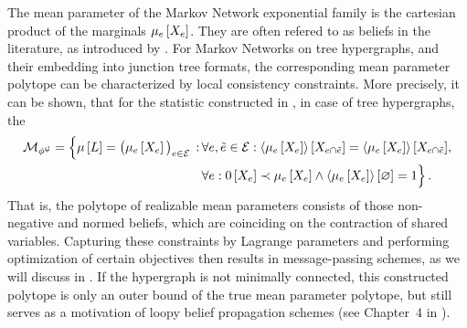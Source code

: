 The mean parameter of the Markov Network exponential family is the cartesian product of the marginals $\mu_{e}\left[X_{e}\right]$.
They are often refered to as beliefs in the literature, as introduced by \cite{pearl_probabilistic_1988}.
For Markov Networks on tree hypergraphs, and their embedding into junction tree formats, the corresponding mean parameter polytope can be characterized by local consistency constraints.
More precisely, it can be shown, that for the statistic constructed in , in case of tree hypergraphs, the
\begin{align*}
    \mathcal{M}_{\phi^{\mathcal{G}}}
    = \Big\{ \mu\left[L\right]=\big(\mu_{e}\left[X_{e}\right]\big)_{e\in\mathcal{E}} \, : \,
    & \forall{e,\tilde{e}\in\mathcal{E}}:{
        \left\langle \mu_{e}\left[X_{e}\right]\right\rangle \left[ X_{e\cap\tilde{e}} \right] = \left\langle \mu_{e}\left[X_{e}\right]\right\rangle \left[ X_{e\cap\tilde{e}} \right]}, \\
    & \forall{e}:{0\left[X_{e}\right] \prec \mu_{e}\left[X_{e}\right] \land \left\langle \mu_{e}\left[X_{e}\right]\right\rangle \left[ \varnothing \right]=1} \Big\} \, .
\end{align*}
That is, the polytope of realizable mean parameters consists of those non-negative and normed beliefs, which are coinciding on the contraction of shared variables.
Capturing these constraints by Lagrange parameters and performing optimization of certain objectives then results in message-passing schemes, as we will discuss in .
If the hypergraph is not minimally connected, this constructed polytope is only an outer bound of the true mean parameter polytope, but still serves as a motivation of loopy belief propagation schemes (see Chapter~4 in \cite{wainwright_graphical_2008}).




\label{sec:mintermExpFamily}



